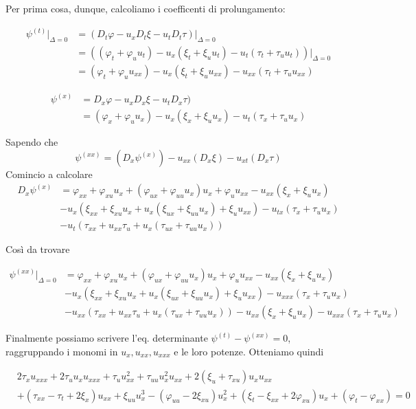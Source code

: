 \documentclass{report}
\begin{document}
Per prima cosa, dunque, calcoliamo i coefficenti di prolungamento: 

\begin{align}
    \psi^{(t)}|_{\Delta=0} &= (D_t\varphi -u_xD_t\xi - u_tD_t\tau)|_{\Delta=0} \\
    &= ((\varphi_t + \varphi_uu_t) -u_x(\xi_t + \xi_uu_t) - u_t(\tau_t + \tau_u u_t))|_{\Delta =0} \\
    &= (\varphi_t + \varphi_uu_{xx}) -u_x(\xi_t + \xi_uu_{xx}) - u_{xx}(\tau_t + \tau_u u_{xx})
\end{align}

\begin{align}
    \psi^{(x)} &= D_x \varphi - u_{x}D_x\xi - u_{t}D_x\tau) \\
    &= (\varphi_x + \varphi_uu_x) - u_x(\xi_x + \xi_uu_x ) - u_t(\tau_x + \tau_uu_x)
\end{align}

Sapendo che 
\begin{equation}
    \psi^{(xx)} = (D_x\psi^{(x)}) - u_{xx}(D_x\xi) - u_{xt}(D_x\tau)
\end{equation}
Comincio a calcolare 
\begin{align*}
    D_x\psi^{(x)} &= \varphi_{xx}+ \varphi_{xu}u_x + (\varphi_{ux}+ \varphi_{uu}u_x)u_x + \varphi_uu_{xx} - u_{xx}(\xi_x + \xi_uu_x ) \\ &-u_x(\xi_{xx} + \xi_{xu}u_x +u_x(\xi_{ux}+ \xi_{uu}u_x) + \xi_uu_{xx}) - u_{tx}(\tau_x + \tau_uu_x) \\ &- u_t(\tau_{xx} + u_{xx}\tau_u + u_x(\tau_{ux}+ \tau_{uu}u_x))
\end{align*}

Così da trovare 

\begin{align*}
    \psi^{(xx)}|_{\Delta =0} &= \varphi_{xx}+ \varphi_{xu}u_x + (\varphi_{ux}+ \varphi_{uu}u_x)u_x + \varphi_uu_{xx} - u_{xx}(\xi_x + \xi_uu_x ) \\ &-u_x(\xi_{xx} + \xi_{xu}u_x +u_x(\xi_{ux}+ \xi_{uu}u_x) + \xi_uu_{xx}) - u_{xxx}(\tau_x + \tau_uu_x) \\ &- u_{xx}(\tau_{xx} + u_{xx}\tau_u + u_x(\tau_{ux}+ \tau_{uu}u_x)) - u_{xx}(\xi_x + \xi_uu_x) - u_{xxx}(\tau_x +\tau_uu_x)
\end{align*}

Finalmente possiamo scrivere l'eq. determinante $\psi^{(t)} - \psi^{(xx)}=0$, raggruppando i monomi in $u_x, u_{xx}, u_{xxx}$ e le loro potenze. Otteniamo quindi 

\begin{align*}
    & 2\tau_x u_{xxx} + 2\tau_u u_x u_{xxx} + \tau_u u_{xx}^2 + \tau_{uu} u_x^2 u_{xx}
+ 2(\xi_u + \tau_{xu}) u_x u_{xx} \\ & + (\tau_{xx} - \tau_t + 2\xi_x) u_{xx} + \xi_{uu} u_x^3
- (\varphi_{uu} - 2\xi_{xu}) u_x^2 + (\xi_t - \xi_{xx} + 2\varphi_{xu}) u_x + (\varphi_t - \varphi_{xx}) = 0
\end{align*}
\end{document}
